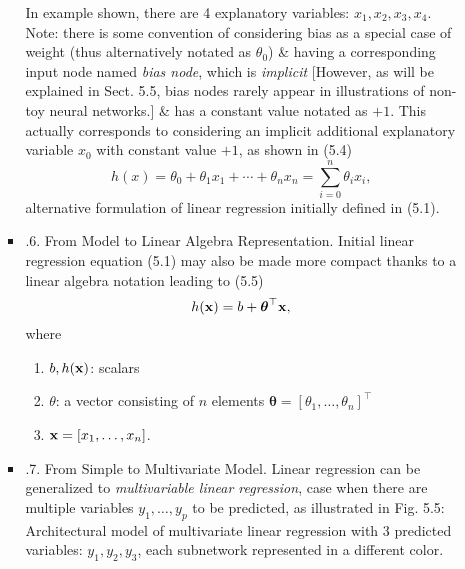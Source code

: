\documentclass{article}
\begin{document}
\begin{itemize}
\begin{itemize}
\begin{itemize}
			In example shown, there are 4 explanatory variables: $x_1,x_2,x_3,x_4$. Note: there is some convention of considering bias as a special case of weight (thus alternatively notated as $\theta_0$) \& having a corresponding input node named {\it bias node}, which is {\it implicit} [However, as will be explained in Sect. 5.5, bias nodes rarely appear in illustrations of non-toy neural networks.] \& has a constant value notated as $+1$. This actually corresponds to considering an implicit additional explanatory variable $x_0$ with constant value $+1$, as shown in (5.4)
			\begin{equation*}
				h(x) = \theta_0 + \theta_1x_1 + \cdots + \theta_nx_n = \sum_{i=0}^n \theta_ix_i,
			\end{equation*}
			alternative formulation of linear regression initially defined in (5.1).
			\item {.6. From Model to Linear Algebra Representation.} Initial linear regression equation (5.1) may also be made more compact thanks to a linear algebra notation leading to (5.5)
			\begin{equation*}
				h({\bf x}) = b + \boldsymbol{\theta}^\top{\bf x},
			\end{equation*}
			where
			\begin{enumerate}
				\item $b,h({\bf x})$: scalars
				\item $\theta$: a vector consisting of $n$ elements $\boldsymbol{\theta} = [\theta_1,\ldots,\theta_n]^\top$
				\item ${\bf x} = [x_1,\ldots,x_n]$.
			\end{enumerate}
			\item {.7. From Simple to Multivariate Model.} Linear regression can be generalized to {\it multivariable linear regression}, case when there are multiple variables $y_1,\ldots,y_p$ to be predicted, as illustrated in {\sf Fig. 5.5: Architectural model of multivariate linear regression} with 3 predicted variables: $y_1,y_2,y_3$, each subnetwork represented in a different color.
			

\end{itemize}
\end{itemize}
\end{itemize}
\end{document}

